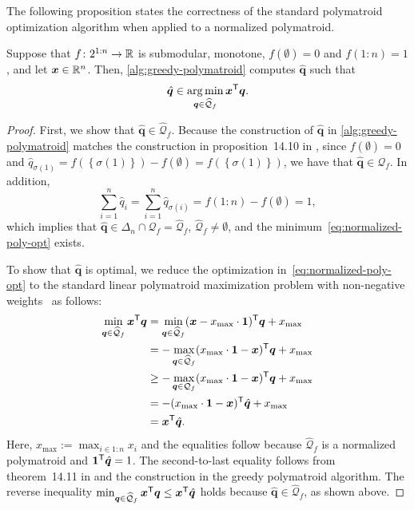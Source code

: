The following proposition states the correctness of the standard polymatroid optimization algorithm when applied to a normalized polymatroid. 
\begin{proposition} \label{prop:standard-polymatroid-works}
Suppose that $f\colon  2^{1{:}n} \to \mathbb{R}$ is submodular, monotone, $f(\emptyset) = 0$ and $f(1{:}n) = 1$, and let $\bm{x}\in \mathbb{R}^n$. Then, \cref{alg:greedy-polymatroid} computes $\hat{\bm{q}}$ such that
  \begin{equation} \label{eq:normalized-poly-opt}
    \hat{\bm{q}}  \in  \operatorname*{arg\,min}_{\bm{q}\in \widehat{\mathcal{Q}}_f}  \bm{x}^{\mathsf{T}} \bm{q}.
\end{equation}
\end{proposition}
\begin{proof}
First, we show that $\hat{\bm{q}} \in \widehat{\mathcal{Q}}_f$. Because the construction of $\hat{\bm{q}}$ in \cref{alg:greedy-polymatroid} matches the construction in proposition~14.10 in \citet{Korte2012}, since $f(\emptyset) = 0$ and $\hat{q}_{\sigma(1)} = f(\left\{ \sigma(1) \right\}) - f(\emptyset) = f(\left\{ \sigma(1) \right\})$, we have that $\hat{\bm{q}}  \in \mathcal{Q}_f$. In addition, 
  \[
   \sum_{i=1}^n \hat{q}_i =  
   \sum_{i=1}^n \hat{q}_{\sigma (i)} = f(1{:}n) - f(\emptyset) = 1, 
  \]
which implies that $\hat{\bm{q}} \in \Delta_n \cap \mathcal{Q}_f = \widehat{\mathcal{Q}}_f$, $\widehat{\mathcal{Q}}_f \neq \emptyset$, and the minimum~\eqref{eq:normalized-poly-opt} exists.

To show that $\hat{\bm{q}} $ is optimal, we reduce the optimization in~\eqref{eq:normalized-poly-opt} to the standard linear polymatroid maximization problem with non-negative weights~\cite[section 14.2]{Korte2012} as follows:
\begin{align*}
  \min_{\bm{q}\in \widehat{\mathcal{Q}}_f}  \bm{x}^{\mathsf{T}} \bm{q}
  &= \min_{\bm{q}\in \widehat{\mathcal{Q}}_f}  (\bm{x} - x_{\max}\cdot \bm{1}) ^{\mathsf{T}} \bm{q} +  x_{\max}\\
  &= -\max_{\bm{q}\in \widehat{\mathcal{Q}}_f}  (x_{\max}\cdot \bm{1} - \bm{x}) ^{\mathsf{T}} \bm{q} + x_{\max}\\
  &\ge -\max_{\bm{q}\in \mathcal{Q}_f}  (x_{\max}\cdot \bm{1} - \bm{x}) ^{\mathsf{T}} \bm{q} + x_{\max}\\
  &= - (x_{\max}\cdot \bm{1} - \bm{x}) ^{\mathsf{T}} \hat{\bm{q}} + x_{\max} \\
  &=  \bm{x}^{\mathsf{T}} \hat{\bm{q}}.
\end{align*}
Here, $x_{\max} := \max_{i\in 1{:}n} x_i $ and the equalities follow because $\widehat{\mathcal{Q}}_f$ is a normalized polymatroid and $\bm{1}^{\mathsf{T}} \hat{\bm{q}} = 1$. The second-to-last equality follows from theorem~14.11 in \citet{Korte2012} and the construction in the greedy polymatroid algorithm. The reverse inequality $\min_{\bm{q}\in \widehat{\mathcal{Q}}_f} \bm{x}^{\mathsf{T}} \bm{q} \le \bm{x}^{\mathsf{T}} \hat{\bm{q}}$ holds because $\hat{\bm{q}} \in \widehat{\mathcal{Q}}_f$, as shown above. 
\end{proof}

